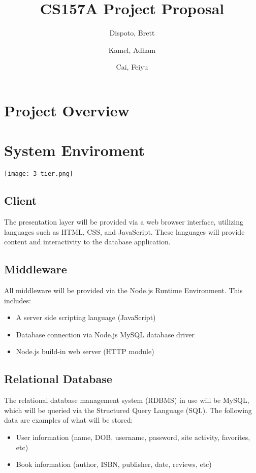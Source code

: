 \documentclass[titlepage]{article}
\author{ Dispoto, Brett\\
	\and
	Kamel, Adham\\
	\and
	Cai, Feiyu\\
}
\title{CS157A Project Proposal}
\begin{document}
	\maketitle
	
	\section{Project Overview}	
	



	\section{System Enviroment}
	
	\texttt{[image: 3-tier.png]}
	
	\subsection{Client}
		The presentation layer will be provided via a web browser interface, utilizing languages such as HTML, CSS, and JavaScript. These languages will provide content and interactivity to the database application.
	\subsection{Middleware}
		All middleware will be provided via the Node.js Runtime Environment. This includes: 
	\begin{itemize}
		\item A server side scripting language (JavaScript)
		\item Database connection via Node.js MySQL database driver	
		\item Node.js build-in web server (HTTP module)
	\end{itemize}
	
	\subsection{Relational Database}
		The relational database management system (RDBMS) in use will be MySQL, which will be queried via the Structured Query Language (SQL). The following data are examples of what will be stored:
	\begin{itemize}
		\item User information (name, DOB, username, password, site activity, favorites, etc)
		\item Book information (author, ISBN, publisher, date, reviews, etc)
	\end{itemize}
\end{document}
